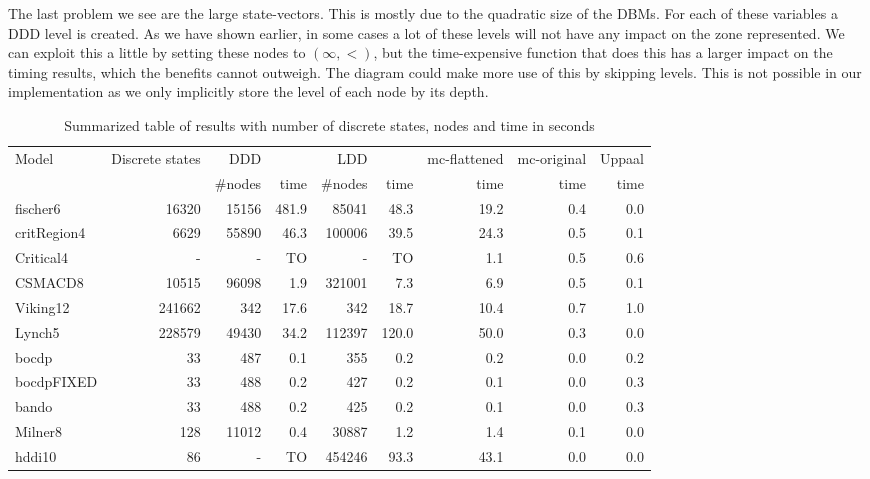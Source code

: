 The last problem we see are the large state-vectors. This is mostly due to the quadratic size of the DBMs. For each of these variables a DDD level is created. As we have shown earlier, in some cases a lot of these levels will not have any impact on the zone represented. We can exploit this a little by setting these nodes to $(\infty,<)$, but the time-expensive function that does this has a larger impact on the timing results, which the benefits cannot outweigh. The diagram could make more use of this by skipping levels. This is not possible in our implementation as we only implicitly store the level of each node by its depth. 

\begin{landscape}
\begin{table}
    \begin{tabular}{|l|r|rr|rr|r|r|r|}
    \hline
     Model      & Discrete states & DDD     & ~     & LDD     & ~     & mc-flattened & mc-original & Uppaal \\
    ~           & ~               & \#nodes & time  & \#nodes & time  & time         & time        & time   \\ \hline
    fischer6    & 16320           & 15156   & 481.9 & 85041   & 48.3  & 19.2         & 0.4         & 0.0    \\
    critRegion4 & 6629            & 55890   & 46.3  & 100006  & 39.5  & 24.3         & 0.5         & 0.1    \\
    Critical4   & -               & -       & TO    & -       & TO    & 1.1          & 0.5         & 0.6    \\
    CSMACD8     & 10515           & 96098   & 1.9   & 321001  & 7.3   & 6.9          & 0.5         & 0.1    \\
    Viking12    & 241662          & 342     & 17.6  & 342     & 18.7  & 10.4         & 0.7         & 1.0    \\
    Lynch5      & 228579          & 49430   & 34.2  & 112397  & 120.0 & 50.0         & 0.3         & 0.0    \\
    bocdp       & 33              & 487     & 0.1   & 355     & 0.2   & 0.2          & 0.0         & 0.2    \\
    bocdpFIXED  & 33              & 488     & 0.2   & 427     & 0.2   & 0.1          & 0.0         & 0.3    \\
    bando       & 33              & 488     & 0.2   & 425     & 0.2   & 0.1          & 0.0         & 0.3    \\
    Milner8     & 128             & 11012   & 0.4   & 30887   & 1.2   & 1.4          & 0.1         & 0.0    \\
    hddi10      & 86              & -       & TO    & 454246  & 93.3  & 43.1         & 0.0         & 0.0    \\ \hline
    \end{tabular}
\caption{Summarized table of results with number of discrete states, nodes and time in seconds}
\label{tab:results-summary}
\end{table}
\end{landscape}

